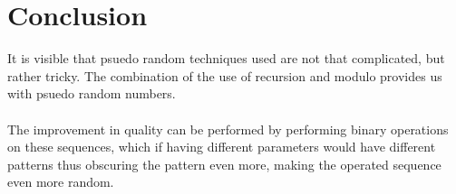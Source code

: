 \section{Conclusion}
It is visible that psuedo random techniques used are not 
that complicated, but rather tricky. The combination of 
the use of recursion and modulo provides us with psuedo 
random numbers. 
\\\\
The improvement in quality can be performed 
by performing binary operations on these sequences, which 
if having different parameters would have different patterns 
thus obscuring the pattern even more, making the operated 
sequence even more random.